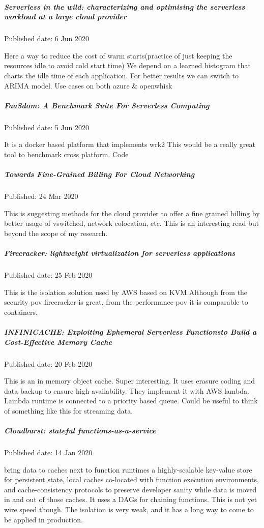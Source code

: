 \documentclass[12pt,titlepage]{article}
\begin{document}
\subparagraph{Serverless in the wild: characterizing and optimising the serverless workload at a large cloud provider}
\label{sec:org2dc6cb8}

Published date: 6 Jun 2020

Here a way to reduce the cost of warm starts(practice of just keeping the resources idle to avoid cold start time)
We depend on a learned histogram that charts the idle time of each application. 
For better results we can switch to ARIMA model. 
Use cases on both azure \& openwhisk
\subparagraph{FaaSdom: A Benchmark Suite For Serverless Computing}
\label{sec:orgb40da39}

Published date: 5 Jun 2020

It is a docker based platform that implements wrk2
This would be a really great tool to benchmark cross platform. Code

\subparagraph{Towards Fine-Grained Billing For Cloud Networking}
\label{sec:org7484196}

Published: 24 Mar 2020

This is suggesting methods for the cloud provider to offer a fine grained billing by better usage of vswitched, network colocation, etc.
This is an interesting read but beyond the scope of my research.

\subparagraph{Firecracker: lightweight virtualization for serverless applications}
\label{sec:org2f92a39}

Published date: 25 Feb 2020

This is the isolation solution used by AWS based on KVM
Although from the security pov firecracker is great, from the performance pov it is comparable to containers.

\subparagraph{INFINICACHE: Exploiting Ephemeral Serverless Functionsto Build a Cost-Effective Memory Cache}
\label{sec:org5d73ada}

Published date: 20 Feb 2020

This is an in memory object cache. Super interesting. It uses erasure coding and data backup to ensure high availability. 
They implement it with AWS lambda. Lambda runtime is connected to a priority based queue. Could be useful to think of something like this for streaming data.

\subparagraph{Cloudburst: stateful functions-as-a-service}
\label{sec:org74d576d}

Published date: 14 Jan 2020

bring data to caches next to function runtimes
a highly-scalable key-value store for persistent state, local caches co-located with function execution environments, and cache-consistency protocols to preserve developer sanity while data is moved in and out of those caches.
It uses a DAGs for chaining functions. This is not yet wire speed though. 
The isolation is very weak, and it has a long way to come to be applied in production. 
\end{document}
